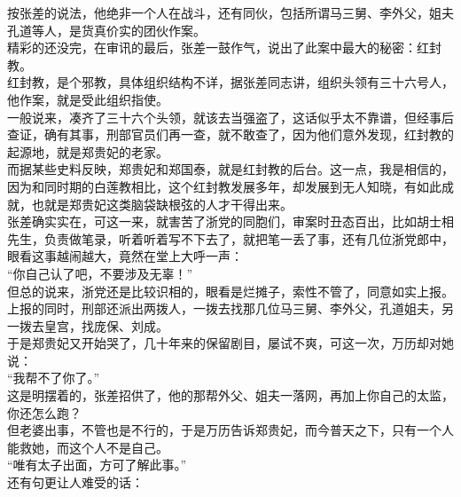 \begin{multicols}{\theparacolNo}
按张差的说法，他绝非一个人在战斗，还有同伙，包括所谓马三舅、李外父，姐夫孔道等人，是货真价实的团伙作案。\\

精彩的还没完，在审讯的最后，张差一鼓作气，说出了此案中最大的秘密：红封教。\\

红封教，是个邪教，具体组织结构不详，据张差同志讲，组织头领有三十六号人，他作案，就是受此组织指使。\\

一般说来，凑齐了三十六个头领，就该去当强盗了，这话似乎太不靠谱，但经事后查证，确有其事，刑部官员们再一查，就不敢查了，因为他们意外发现，红封教的起源地，就是郑贵妃的老家。\\

而据某些史料反映，郑贵妃和郑国泰，就是红封教的后台。这一点，我是相信的，因为和同时期的白莲教相比，这个红封教发展多年，却发展到无人知晓，有如此成就，也就是郑贵妃这类脑袋缺根弦的人才干得出来。\\

张差确实实在，可这一来，就害苦了浙党的同胞们，审案时丑态百出，比如胡士相先生，负责做笔录，听着听着写不下去了，就把笔一丢了事，还有几位浙党郎中，眼看这事越闹越大，竟然在堂上大呼一声：\\

“你自己认了吧，不要涉及无辜！”\\

但总的说来，浙党还是比较识相的，眼看是烂摊子，索性不管了，同意如实上报。\\

上报的同时，刑部还派出两拨人，一拨去找那几位马三舅、李外父，孔道姐夫，另一拨去皇宫，找庞保、刘成。\\

于是郑贵妃又开始哭了，几十年来的保留剧目，屡试不爽，可这一次，万历却对她说：\\

“我帮不了你了。”\\

这是明摆着的，张差招供了，他的那帮外父、姐夫一落网，再加上你自己的太监，你还怎么跑？\\

但老婆出事，不管也是不行的，于是万历告诉郑贵妃，而今普天之下，只有一个人能救她，而这个人不是自己。\\

“唯有太子出面，方可了解此事。”\\

还有句更让人难受的话：\\


\end{multicols}
